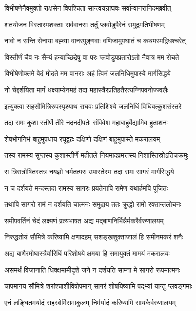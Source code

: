 \twolineshloka
{विभीषणेनैवमुक्तो राक्षसेन विपश्चिता}
{सान्त्वयन्राघवः सर्वान्वानरानिदमब्रवीत्}%

\twolineshloka
{शतयोजन विस्तारमशक्ताः सर्ववानराः}
{तर्तुं प्लवोडुपैरेनं समुद्रमतिभीषणम्}%

\twolineshloka
{नावो न सन्ति सेनाया बह्व्या वानरपुङ्गवाः}
{वणिजामुपघातं च कथमस्मद्विधश्चरेत्}%

\twolineshloka
{विस्तीर्णं चैव नः सैन्यं हन्याच्छिद्रेषु वा परः}
{प्लवोडुपप्रतारोऽतो नैवात्र मम रोचते}%

\twolineshloka
{विभीषेणोक्तमे वेदं मोदते मम वानराः}
{अहं त्विमं जलनिधिमुपास्ये मार्गसिद्धये}%

\twolineshloka
{नो चेद्दर्शयिता मार्गं धक्ष्याम्येनमहं तदा}
{महास्त्रैरप्रतिहतैरत्यग्निपवनोज्ज्वलैः}%

\twolineshloka
{इत्युक्त्वा सहसौमित्रिरुपस्पृश्याथ राघवः}
{प्रतिशिश्ये जलनिधिं विधिवत्कुशसंस्तरे}%

\twolineshloka
{तदा रामः कुशा स्तीर्णे तीरे नदनदीपतेः}
{संविवेश महाबाहुर्वेद्यामिव हुताशनः}%

\twolineshloka
{शेषभोगनिभं बाहुमुपधाय रघूद्वहः}
{दक्षिणो दक्षिणं बाहुमुपास्ते मकरालयम्}%

\twolineshloka
{तस्य रामस्य सुप्तस्य कुशास्तीर्णे महीतले}
{नियमादप्रमत्तस्य निशास्तिस्रोऽतिचक्रमुः}%

\twolineshloka
{स त्रिरात्रोषितस्तत्र नयज्ञो धर्मतत्परः}
{उपास्तेस्म तदा रामः सागरं मार्गसिद्धये}%

\twolineshloka
{न च दर्शयते मन्दस्तदा रामस्य सागरः}
{प्रयतेनापि रामेण यथार्हमपि पूजितः}%

\twolineshloka
{तथापि सागरो रामं न दर्शयति चात्मनः}
{समुद्राय ततः क्रुद्धो रामो रक्तान्तलोचनः}%

\twolineshloka
{समीपवर्तिनं चेदं लक्ष्मणं प्रत्यभाषत}
{अद्य मद्बाणनिर्भिन्नैर्मकरैर्वरुणालयम्}%

\twolineshloka
{निरुद्धतोयं सौमित्रे करिष्यामि क्षणादहम्}
{सशङ्खशुक्ताजालं हि समीनमकरं शनैः}%

\twolineshloka
{अद्य बाणैरमोघास्त्रैर्वारिधिं परिशोषये}
{क्षमया हि समायुक्तं मामयं मकरालयः}%

\twolineshloka
{असमर्थं विजानाति धिक्क्षमामीदृशे जने}
{न दर्शयति साम्ना मे सागरो रूपमात्मनः}%

\twolineshloka
{चापमानय सौमित्रे शरांश्चाशीविषोपमान्}
{सागरं शोषयिष्यामि पद्भ्यां यान्तु प्लवङ्गमाः}%

\twolineshloka
{एनं लङ्घितमर्यादं सहस्रोर्मिसमाकुलम्}
{निर्मर्यादं करिष्यामि सायकैर्वरुणालयम्}%

